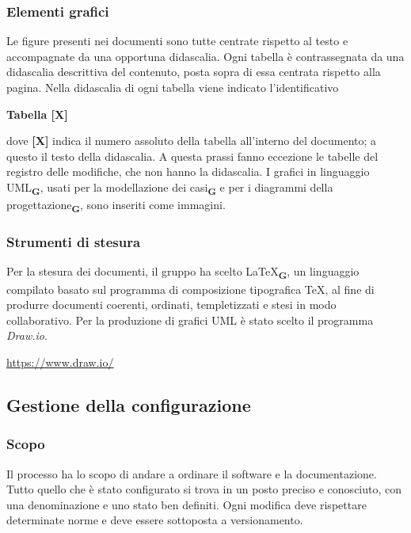 \subsubsection{Elementi grafici}
Le figure presenti nei documenti sono tutte centrate rispetto al testo e accompagnate da una opportuna didascalia.
Ogni tabella è contrassegnata da una didascalia descrittiva del contenuto, posta sopra di essa centrata rispetto alla pagina.  Nella didascalia di ogni tabella viene indicato l'identificativo
\begin{center}
    \textbf{Tabella [X]}
\end{center}
dove \textbf{[X]} indica il numero assoluto della tabella all'interno del documento; a questo il testo della didascalia. A questa prassi fanno eccezione le tabelle del registro delle modifiche, che non hanno la didascalia.
I grafici in linguaggio UML\textsubscript{\textbf{G}}, usati per la modellazione dei casi\textsubscript{\textbf{G}} e per i diagrammi della progettazione\textsubscript{\textbf{G}}, sono inseriti come immagini.
\subsubsection{Strumenti di stesura}
\subsubsubsection{\LaTeX}
Per la stesura dei documenti, il gruppo ha scelto \LaTeX\textsubscript{\textbf{G}}, un linguaggio compilato basato sul programma di composizione tipografica \TeX, al fine di produrre documenti coerenti, ordinati, templetizzati e stesi in modo collaborativo.
Per la produzione di grafici UML è stato scelto il programma \textit{Draw.io}.
\begin{center}
    \href{https://www.draw.io/}{https://www.draw.io/}\\
\end{center}
\subsection{Gestione della configurazione}
\subsubsection{Scopo}
Il processo ha lo scopo di andare a ordinare il software e la documentazione. Tutto quello che è stato configurato si trova in un posto preciso e conosciuto, con una denominazione e uno stato ben definiti. Ogni modifica deve rispettare determinate norme e deve essere sottoposta a versionamento.
